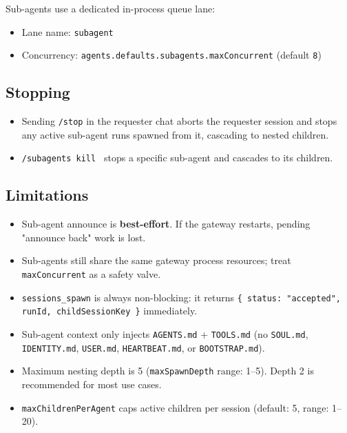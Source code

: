 Sub-agents use a dedicated in-process queue lane:

\begin{itemize}
  \item Lane name: \texttt{subagent}
  \item Concurrency: \texttt{agents.defaults.subagents.maxConcurrent} (default \texttt{8})
\end{itemize}


\subsection{Stopping}


\begin{itemize}
  \item Sending \texttt{/stop} in the requester chat aborts the requester session and stops any active sub-agent runs spawned from it, cascading to nested children.
  \item \texttt{/subagents kill } stops a specific sub-agent and cascades to its children.
\end{itemize}


\subsection{Limitations}


\begin{itemize}
  \item Sub-agent announce is \textbf{best-effort}. If the gateway restarts, pending "announce back" work is lost.
  \item Sub-agents still share the same gateway process resources; treat \texttt{maxConcurrent} as a safety valve.
  \item \texttt{sessions\_spawn} is always non-blocking: it returns \texttt{\{ status: "accepted", runId, childSessionKey \}} immediately.
  \item Sub-agent context only injects \texttt{AGENTS.md} + \texttt{TOOLS.md} (no \texttt{SOUL.md}, \texttt{IDENTITY.md}, \texttt{USER.md}, \texttt{HEARTBEAT.md}, or \texttt{BOOTSTRAP.md}).
  \item Maximum nesting depth is 5 (\texttt{maxSpawnDepth} range: 1–5). Depth 2 is recommended for most use cases.
  \item \texttt{maxChildrenPerAgent} caps active children per session (default: 5, range: 1–20).
\end{itemize}



\clearpage

